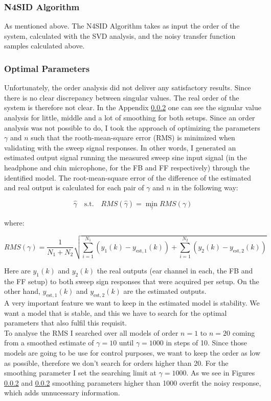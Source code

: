 \subsubsection{N4SID Algorithm}

As mentioned above. The N4SID Algorithm takes as input the order of the system, calculated with the SVD analysis, and the noisy transfer function samples calculated above. 

\subsubsection{Optimal Parameters}

Unfortunately, the order analysis did not deliver any satisfactory results. Since there is no clear discrepancy between singular values. The real order of the system is therefore not clear. In the Appendix \ref{} one can see the signular value analysis for little, middle and a lot of smoothing for both setups. Since an order analysis was not possible to do, I took the approach of optimizing the parameters $\gamma$ and $n$ such that the rooth-mean-square error (RMS) is minimized when validating with the sweep signal responses. In other words, I generated an estimated output signal running the measured sweep sine input signal (in the headphone and chin microphone, for the FB and FF respectively) through the identified model. The root-mean-square error of the difference of the estimated and real output is calculated for each pair of $\gamma$ and $n$ in the following way:

\[\hat{\gamma} \quad\text{s.t.}\quad RMS(\hat{\gamma}) = \min\limits_\gamma RMS(\gamma)\]

where:

\[RMS(\gamma) = \frac{1}{N_1 + N_2} \sqrt{\sum\limits_{i=1}^{N_1}(y_1(k)-y_{\text{est},1}(k))+\sum\limits_{i=1}^{N_2}(y_2(k)-y_{\text{est},2}(k))}\]

Here are $y_1(k)$ and $y_2(k)$ the real outputs (ear channel in each, the FB and the FF setup) to both sweep sign responses that were acquired per setup. On the other hand, $y_{\text{est},1}(k)$ and $y_{\text{est},2}(k)$ are the estimated outputs.\\

A very important feature we want to keep in the estimated model is stability. We want a model that is stable, and this we have to search for the optimal parameters that also fulfil this requisit.\\

To analyse the RMS I searched over all models of order $n=1$ to $n = 20$ coming from a smoothed estimate of $\gamma = 10$ until $\gamma = 1000$ in steps of 10. Since those models are going to be use for control purposes, we want to keep the order as low as possible, therefore we don't search for orders higher than 20. For the smoothing parameter I set the searching limit at $\gamma = 1000$. As we see in Figures \ref{} and \ref{} smoothing parameters higher than 1000 overfit the noisy response, which adds unnucessary information. \\



